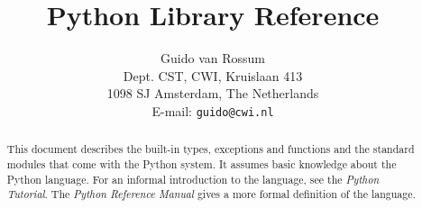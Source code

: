 

\newcommand{\cbstart}{}
\newcommand{\cbend}{}

\newcommand{\itembreak}{
	\mbox{}\\*[0mm]
}

\newcommand{\funcitem}[2]{\item[#1(#2)]}

\newcommand{\dataitem}[1]{\item[#1]}

\newcommand{\excitem}[2]{
\item[#1 = {\tt '#2'}]
\itembreak
}

\title{\bf
	Python Library Reference
}

\author{
	Guido van Rossum \\
	Dept. CST, CWI, Kruislaan 413 \\
	1098 SJ Amsterdam, The Netherlands \\
	E-mail: {\tt guido@cwi.nl}
}




\maketitle

\begin{abstract}

\noindent
This document describes the built-in types, exceptions and functions
and the standard modules that come with the Python system.  It assumes
basic knowledge about the Python language.  For an informal
introduction to the language, see the {\em Python Tutorial}.  The {\em
Python Reference Manual} gives a more formal definition of the
language.

\end{abstract}

\pagebreak

\tableofcontents

\pagebreak




